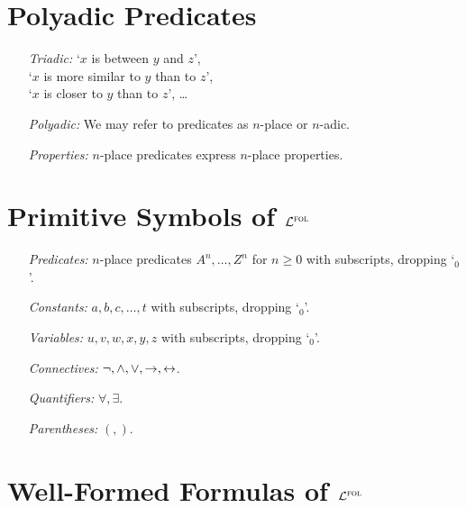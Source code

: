 \documentclass[a4paper, 11pt]{article} %
\begin{document}
\section*{Polyadic Predicates}

\begin{enumerate}
  \item[\it Triadic:] 
    `$x$ is between $y$ and $z$',\\
    `$x$ is more similar to $y$ than to $z$',\\
    `$x$ is closer to $y$ than to $z$', \ldots 
  \item[\it Polyadic:] We may refer to predicates as $n$-place or $n$-adic.
  \item[\it Properties:] $n$-place predicates express $n$-place properties.
\end{enumerate}





\section*{Primitive Symbols of $\mathcal{L}^{\textsc{fol}}$}

\begin{enumerate}
  \item[\it Predicates:] $n$-place predicates $A^n,\ldots,Z^n$  for $n\geq 0$ with subscripts, dropping `$_0$'.
  \item[\it Constants:] $a,b,c,\ldots,t$ with subscripts, dropping `$_0$'.
  \item[\it Variables:] $u,v,w,x,y,z$ with subscripts, dropping `$_0$'.
  \item[\it Connectives:] $\neg, \wedge, \vee, \rightarrow, \leftrightarrow$.
  \item[\it Quantifiers:] $\forall, \exists$.
  \item[\it Parentheses:] $(,)$.
\end{enumerate}




\section*{Well-Formed Formulas of $\mathcal{L}^{\textsc{fol}}$}
\end{document}
